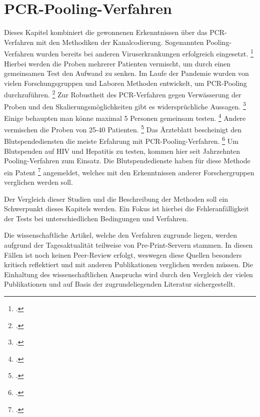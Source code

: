 \section{PCR-Pooling-Verfahren}
Dieses Kapitel kombiniert die gewonnenen Erkenntnissen über das PCR-Verfahren mit den Methodiken der Kanalcodierung.
Sogenannten Pooling-Verfahren wurden bereits bei anderen Viruserkrankungen erfolgreich eingesetzt.
\footcite{Aertzeblatt}
Hierbei werden die Proben mehrerer Patienten vermischt, um durch einen gemeinsamen Test den Aufwand zu senken.
Im Laufe der Pandemie wurden von vielen Forschungsgruppen und Laboren Methoden entwickelt, um PCR-Pooling durchzuführen.
\footcite{Reddit Quelle}
Zur Robustheit des PCR-Verfahren gegen Verwässerung der Proben und den Skalierungsmöglichkeiten gibt es widersprüchliche Aussagen.
\footcite{Alternative Quelle Pooling}
Einige behaupten man könne maximal 5 Personen gemeinsam testen.
\footcite{Quelle}
Andere vermischen die Proben von 25-40 Patienten.
\footcite{Quelle}
Das Ärzteblatt bescheinigt den Blutspendediensten die meiste Erfahrung mit PCR-Pooling-Verfahren.
\footcite{Aertzeblatt}
Um Blutspenden auf HIV und Hepatitis zu testen, kommen hier seit Jahrzehnten Pooling-Verfahren zum Einsatz.
Die Blutspendedienste haben für diese Methode ein Patent
\footcite{Patent Blutspende}
angemeldet, welches mit den Erkenntnissen anderer Forschergruppen verglichen werden soll.

Der Vergleich dieser Studien und die Beschreibung der Methoden soll ein Schwerpunkt dieses Kapitels werden.
Ein Fokus ist hierbei die Fehleranfälligkeit der Tests bei unterschiedlichen Bedingungen und Verfahren.

Die wissenschaftliche Artikel, welche den Verfahren zugrunde liegen, werden aufgrund der Tagesaktualität teilweise von Pre-Print-Servern stammen.
In diesen Fällen ist noch keinen Peer-Review erfolgt, weswegen diese Quellen besonders kritisch reflektiert und mit anderen Publikationen verglichen werden müssen.
Die Einhaltung des wissenschaftlichen Anspruchs wird durch den Vergleich der vielen Publikationen und auf Basis der zugrundeliegenden Literatur sichergestellt.